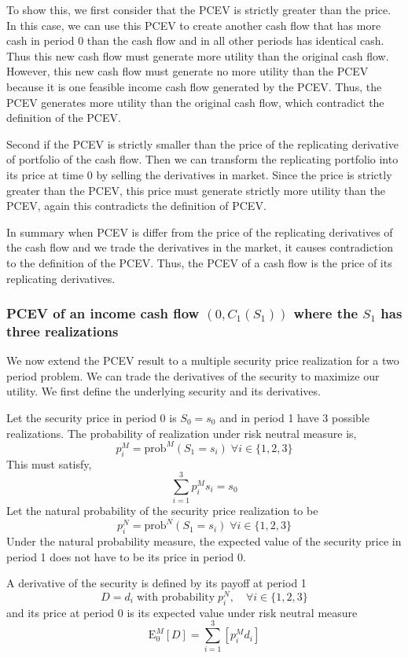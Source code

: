 \documentclass{article}[12pt letter]
\newcommand{\E}{\mathrm{E}}
\begin{document}
To show this, we first consider that the PCEV is strictly greater than the price. In this case, we can use this PCEV to create another cash flow that has more cash in period 0 than the cash flow and in all other periods has identical cash. Thus this new cash flow must generate more utility than the original cash flow. However, this new cash flow must generate no more utility than the PCEV because it is one feasible income cash flow generated by the PCEV. Thus, the PCEV generates more utility than the original cash flow, which contradict the definition of the PCEV. 

Second if the PCEV is strictly smaller than the price of the replicating derivative of portfolio of the cash flow. Then we can transform the replicating portfolio into its price at time 0 by selling the derivatives in market. Since the price is strictly greater than the PCEV, this price must generate strictly more utility than the PCEV, again this contradicts the definition of PCEV. 

In summary when PCEV is differ from the price of the replicating derivatives of the cash flow and we trade the derivatives in the market, it causes contradiction to the definition of the PCEV. Thus, the PCEV of a cash flow is the price of its replicating derivatives. 

\subsubsection{PCEV of an income cash flow $(0,C_1(S_1))$ where the $S_1$ has three realizations}

We now extend the PCEV result to a multiple security price realization for a two period problem. We can trade the derivatives of the security to maximize our utility. We first define the underlying security and its derivatives. 


Let the security price in period 0 is $S_0 =s_0$ and in period 1 have $3$ possible realizations.  The probability of realization under risk neutral measure is,
\[p_i^M = \text {prob}^M (S_1 = s_i) \; \forall i \in \{1,2,3\} \]
This must satisfy,
\[ \sum_{i=1}^3 p_i^M s_i = s_0 \]
Let the natural probability of the security price realization to be
\[p_i^N = \text{prob}^N(S_1 = s_i) \; \forall i \in \{1,2,3 \} \]
Under the natural probability measure, the expected value of the security price in period 1 does not have to be its price in period 0. 
 
 A derivative of the security is defined by its payoff at period 1
 \[D =d_i \; \text{with probability} \; p_i^N, \quad \forall i\in\{1,2,3\}\]
 and its price at period 0 is its expected value under risk neutral measure
 \[\E_0^M[D] = \sum_{i=1}^3[p_i^M d_i] \]
 
\end{document}
